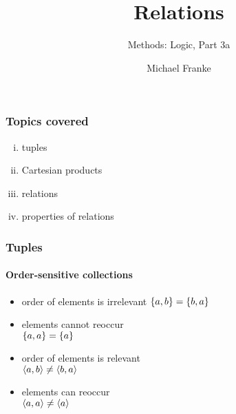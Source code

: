 \documentclass[fleqn,10pt,serif,xcolor=svgnames,xcolor=table,aspectratio=169,handout]{beamer}
\title{Relations}
\subtitle{Methods: Logic, Part 3a}
\author{Michael Franke}
\date{}
\begin{document}

\abovedisplayskip=3pt
\abovedisplayshortskip=3pt

\belowdisplayskip=3pt
\belowdisplayshortskip=3pt

\begin{frame}
  \maketitle
\end{frame}

\begin{frame}
  \frametitle{Topics covered}

  \begin{enumerate}[(i)]
    \item tuples
    \item Cartesian products
    \item relations
    \item properties of relations
  \end{enumerate}

\end{frame}

\begin{frame}
  \frametitle{Tuples}
  \framesubtitle{Order-sensitive collections}

\begin{minipage}{0.45\linewidth}
    \textbf{\color{themecolor}{Sets}}
    \begin{itemize}
      \item order of elements is irrelevant
      $ \left\{a,b\right\} = \left\{b,a\right\}$
      \item elements cannot reoccur \\
      $\left\{a,a\right\} = \left\{a\right\}$
    \end{itemize}
  \end{minipage}
  \hfill
  \begin{minipage}{0.45\linewidth}
    \textbf{\color{themecolor}{Tuples}}
    \begin{itemize}
      \item order of elements is relevant \\
      $ \left \langle a,b\right\rangle \neq \left \langle b,a\right\rangle$
      \item elements can reoccur \\
      $\left \langle a,a\right\rangle \neq \left \langle a\right\rangle$
    \end{itemize}
  \end{minipage}

\end{frame}
\end{document}
